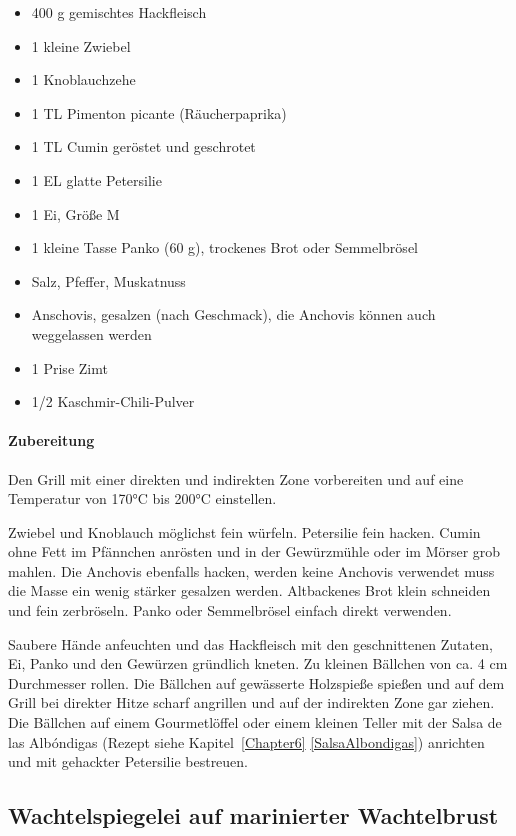 \begin{itemize}[noitemsep]
	\item 400 g gemischtes Hackfleisch
	\item 1 kleine Zwiebel
	\item 1 Knoblauchzehe
	\item 1 TL Pimenton picante (Räucherpaprika)
	\item 1 TL Cumin geröstet und geschrotet
	\item 1 EL glatte Petersilie
	\item 1 Ei, Größe M
	\item 1 kleine Tasse Panko (60 g), trockenes Brot oder Semmelbrösel
	\item Salz, Pfeffer, Muskatnuss
	\item  Anschovis, gesalzen (nach Geschmack), die Anchovis können auch weggelassen werden
	\item 1 Prise Zimt
	\item 1/2 Kaschmir-Chili-Pulver
\end{itemize}

\paragraph{Zubereitung}

Den Grill mit einer direkten und indirekten Zone vorbereiten und auf eine Temperatur von 170°C bis 200°C einstellen.

Zwiebel und Knoblauch möglichst fein würfeln. Petersilie fein hacken. Cumin ohne Fett im Pfännchen anrösten und in der Gewürzmühle 
oder im Mörser grob mahlen. Die Anchovis ebenfalls hacken, werden keine Anchovis verwendet muss die Masse ein wenig stärker 
gesalzen werden. Altbackenes Brot klein schneiden und fein zerbröseln. Panko oder Semmelbrösel einfach direkt verwenden.

Saubere Hände anfeuchten und das Hackfleisch mit den geschnittenen Zutaten, Ei, Panko und den Gewürzen gründlich kneten. Zu 
kleinen Bällchen von ca. 4 cm Durchmesser rollen.
Die Bällchen auf gewässerte Holzspieße spießen und auf dem Grill bei direkter Hitze scharf angrillen und auf der indirekten Zone gar 
ziehen. Die Bällchen auf einem Gourmetlöffel oder einem kleinen Teller mit der Salsa de las Albóndigas (Rezept siehe 
Kapitel~\ref{Chapter6} \vref{SalsaAlbondigas}) anrichten und mit gehackter Petersilie bestreuen.

\subsection{Wachtelspiegelei auf marinierter Wachtelbrust}

